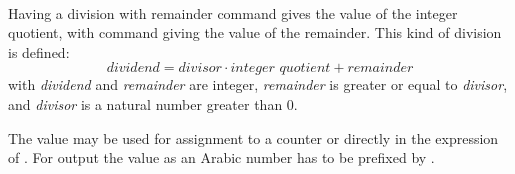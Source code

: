 \begin{Declaration}
  \\
\end{Declaration}%
%
%
Having a division with remainder command
 gives the value of the integer quotient, with command
 giving the value of the remainder. This kind of division is
defined:
\[
\textit{dividend} = \textit{divisor} \cdot
\textit{integer quotient} + \textit{remainder}
\]
with \textit{dividend} and \textit{remainder} are integer, \textit{remainder}
is greater or equal to \textit{divisor}, and \textit{divisor} is a natural
number greater than 0.

The value may be used for assignment to a counter or directly in the
expression of . For output the value as an Arabic number has
to be prefixed by .%
%
%
%
%
%

\endinput

